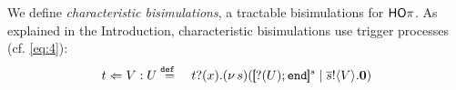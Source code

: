 
\smallskip 

 We define 
\emph{characteristic
bisimulations}, 
a tractable bisimulations for $\mathsf{HO}\pi$.
As explained in %
the Introduction,
characteristic bisimulations
use trigger processes (cf. \eqref{eq:4}):
\begin{eqnarray*}
	t \Leftarrow V : U & \stackrel{\mathtt{def}\ }{=} &  t ? (x) . (\nu\, s)([\!\![? (U) ; \mathtt{end}]\!\!]^{s} \;|\; \overline{s} ! \langle V \rangle . \mathbf{0}) 	\label{eqb:4}
\end{eqnarray*}

%

